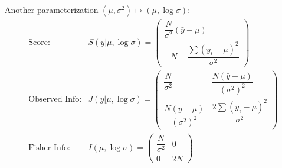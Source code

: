 Another parameterization $ (\mu ,\sigma ^2)\mapsto (\mu ,\log \sigma ) $:
\begin{align*}
    \text{Score:}&S(y|\mu ,\log \sigma )= \begin{pmatrix}
        \dfrac{N}{\sigma ^2}(\bar{y}-\mu )\\
        -N+\dfrac{\sum (y_i-\mu )^2 }{\sigma ^2}
    \end{pmatrix}\\
    \text{Observed Info:}&J(y|\mu ,\log\sigma )= \begin{pmatrix}
        \dfrac{N}{\sigma ^2}&\dfrac{N(\bar{y}-\mu )}{(\sigma ^2)^2}\\
        \dfrac{N(\bar{y}-\mu )}{(\sigma ^2)^2}&\dfrac{2\sum (y_i-\mu )^2}{\sigma ^2}
    \end{pmatrix}\\
    \text{Fisher Info:}&I(\mu ,\log \sigma )=\begin{pmatrix}
        \dfrac{N}{\sigma ^2}&0\\
        0&2N
    \end{pmatrix}
\end{align*}


